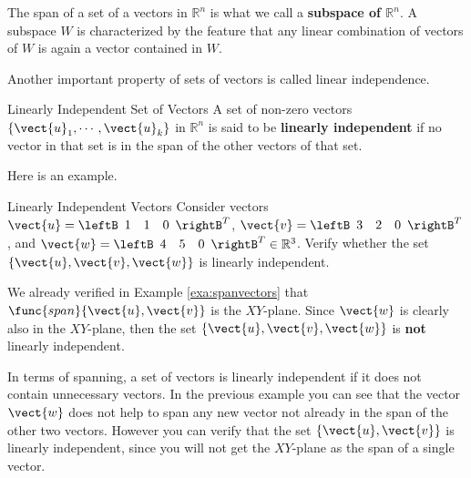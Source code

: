 The span of a set of a vectors in $\mathbb{R}^n$ is what we call a \textbf{subspace of $\mathbb{R}^n$}. A subspace $W$ is characterized by the feature that any linear combination of vectors of $W$ is again a vector contained in $W$. 

Another important property of sets of vectors is called linear independence. 

\begin{definition}{Linearly Independent Set of Vectors}\label{def:linearindependentortho}
A set of non-zero vectors $\{ \vect{u}_1, \cdots ,\vect{u}_k\}$ in $\mathbb{R}^{n}$ is said to be 
\textbf{linearly independent} if no vector in that set is in the span of the other vectors of that set.
\end{definition}

Here is an example.  

\begin{example}{Linearly Independent Vectors}\label{exa:linearlyindependentvectors}
Consider vectors $\vect{u}=\leftB 
\begin{array}{rrr}
1  & 1 & 0
\end{array}
\rightB^T$, 
$\vect{v}=\leftB 
\begin{array}{rrr}
3  & 2 & 0
\end{array}
\rightB^T$, and
$\vect{w}=\leftB 
\begin{array}{rrr}
4  & 5 & 0
\end{array}
\rightB^T  \in \mathbb{R}^{3}$.
Verify whether the set $\{\vect{u}, \vect{v}, \vect{w}\}$ is linearly independent. 
\end{example}

\begin{solution}
We already verified in Example \ref{exa:spanvectors} that
$\func{span} \{\vect{u}, \vect{v} \}$ is the $XY$-plane. Since $\vect{w}$
is clearly also in the $XY$-plane, then the set $\{\vect{u}, \vect{v},
\vect{w}\}$ is \textbf{not} linearly independent.
\end{solution}

In terms of spanning, a set of vectors is linearly independent if it
does not contain unnecessary vectors. In the previous example you
can see that the vector $\vect{w}$ does not help to span any new vector
not already in the span of the other two vectors. However you can
verify that the set $\{\vect{u}, \vect{v}\}$ is linearly independent,
since you will not get the $XY$-plane as the span of a single vector.

